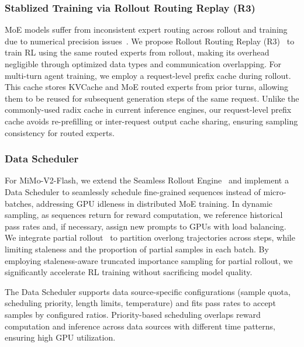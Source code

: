 \subsubsection{Stablized Training via Rollout Routing Replay (R3)}
\label{sec:posttrain:rlinfra:r3}

MoE models suffer from inconsistent expert routing across rollout and training due to numerical precision issues~\citep{he2025nondeterminism,yao2025offpolicy}.
%
We propose Rollout Routing Replay (R3)~\citep{ma2025stabilizing} to train RL using the same routed experts from rollout, making its overhead negligible through optimized data types and communication overlapping.
%
For multi-turn agent training, we employ a request-level prefix cache during rollout.
%
This cache stores KVCache and MoE routed experts from prior turns, allowing them to be reused for subsequent generation steps of the same request.
%
Unlike the commonly-used radix cache in current inference engines, our request-level prefix cache avoids re-prefilling or inter-request output cache sharing, ensuring sampling consistency for routed experts.



\subsubsection{Data Scheduler}
\label{sec:posttrain:rlinfra:data}

For MiMo-V2-Flash, we extend the Seamless Rollout Engine~\citep{xia2025mimo} and implement a Data Scheduler to seamlessly schedule fine-grained sequences instead of micro-batches, addressing GPU idleness in distributed MoE training.
%
In dynamic sampling, as sequences return for reward computation, we reference historical pass rates and, if necessary, assign new prompts to GPUs with load balancing.
%
We integrate partial rollout~\citep{team2025kimi,fu2025areal} to partition overlong trajectories across steps, while limiting staleness and the proportion of partial samples in each batch.
%
By employing staleness-aware truncated importance sampling for partial rollout, we significantly accelerate RL training without sacrificing model quality.

The Data Scheduler supports data source-specific configurations (sample quota, scheduling priority, length limits, temperature) and fits pass rates to accept samples by configured ratios.
%
Priority-based scheduling overlaps reward computation and inference across data sources with different time patterns, ensuring high GPU utilization.

